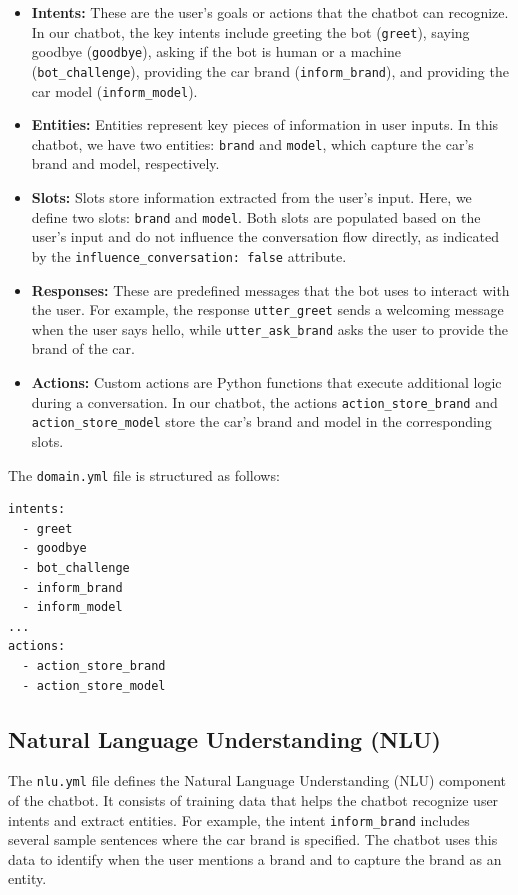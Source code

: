 \documentclass[a4paper,12pt]{article}
\begin{document}
\begin{itemize}
    \item \textbf{Intents:} These are the user's goals or actions that the chatbot can recognize. In our chatbot, the key intents include greeting the bot (\texttt{greet}), saying goodbye (\texttt{goodbye}), asking if the bot is human or a machine (\texttt{bot\_challenge}), providing the car brand (\texttt{inform\_brand}), and providing the car model (\texttt{inform\_model}).
    
    \item \textbf{Entities:} Entities represent key pieces of information in user inputs. In this chatbot, we have two entities: \texttt{brand} and \texttt{model}, which capture the car's brand and model, respectively.
    
    \item \textbf{Slots:} Slots store information extracted from the user's input. Here, we define two slots: \texttt{brand} and \texttt{model}. Both slots are populated based on the user's input and do not influence the conversation flow directly, as indicated by the \texttt{influence\_conversation: false} attribute.
    
    \item \textbf{Responses:} These are predefined messages that the bot uses to interact with the user. For example, the response \texttt{utter\_greet} sends a welcoming message when the user says hello, while \texttt{utter\_ask\_brand} asks the user to provide the brand of the car.
    
    \item \textbf{Actions:} Custom actions are Python functions that execute additional logic during a conversation. In our chatbot, the actions \texttt{action\_store\_brand} and \texttt{action\_store\_model} store the car's brand and model in the corresponding slots.
\end{itemize}

The \texttt{domain.yml} file is structured as follows:

\begin{verbatim}
intents:
  - greet
  - goodbye
  - bot_challenge
  - inform_brand
  - inform_model
...
actions:
  - action_store_brand
  - action_store_model
\end{verbatim}

\subsection{Natural Language Understanding (NLU)}
The \texttt{nlu.yml} file defines the Natural Language Understanding (NLU) component of the chatbot. It consists of training data that helps the chatbot recognize user intents and extract entities. For example, the intent \texttt{inform\_brand} includes several sample sentences where the car brand is specified. The chatbot uses this data to identify when the user mentions a brand and to capture the brand as an entity.
\end{document}
